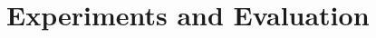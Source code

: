\documentclass[runningheads,a4paper]{llncs}
\begin{document}

\section{Experiments and Evaluation}
\label{sec:experiment}



\end{document}
